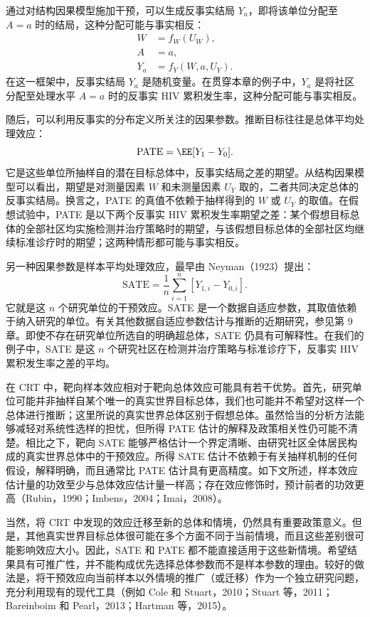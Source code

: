 通过对结构因果模型施加干预，可以生成反事实结局 $Y_a$，即将该单位分配至 $A=a$ 时的结局，这种分配可能与事实相反：
\[
\begin{aligned}
W&=f_W(U_W),\\
A&=a,\\
Y_a&=f_Y(W,a,U_Y).
\end{aligned}
\]
在这一框架中，反事实结局 $Y_a$ 是随机变量。在贯穿本章的例子中，$Y_a$ 是将社区分配至处理水平 $A=a$ 时的反事实 HIV 累积发生率，这种分配可能与事实相反。

随后，可以利用反事实的分布定义所关注的因果参数。推断目标往往是总体平均处理效应：
\[
\mathrm{PATE}=\EE[Y_1-Y_0].
\]
它是这些单位所抽样自的潜在目标总体中，反事实结局之差的期望。从结构因果模型可以看出，期望是对测量因素 $W$ 和未测量因素 $U_Y$ 取的，二者共同决定总体的反事实结局。换言之，PATE 的真值不依赖于抽样得到的 $W$ 或 $U_Y$ 的取值。在假想试验中，PATE 是以下两个反事实 HIV 累积发生率期望之差：某个假想目标总体的全部社区均实施检测并治疗策略时的期望，与该假想目标总体的全部社区均继续标准诊疗时的期望；这两种情形都可能与事实相反。

另一种因果参数是样本平均处理效应，最早由 Neyman（1923）提出：
\[
\mathrm{SATE}=\frac1n\sum_{i=1}^n[Y_{1,i}-Y_{0,i}].
\]
它就是这 $n$ 个研究单位的干预效应。SATE 是一个数据自适应参数，其取值依赖于纳入研究的单位。有关其他数据自适应参数估计与推断的近期研究，参见第 9 章。即使不存在研究单位所选自的明确超总体，SATE 仍具有可解释性。在我们的例子中，SATE 是这 $n$ 个研究社区在检测并治疗策略与标准诊疗下，反事实 HIV 累积发生率之差的平均。

在 CRT 中，靶向样本效应相对于靶向总体效应可能具有若干优势。首先，研究单位可能并非抽样自某个唯一的真实世界目标总体，我们也可能并不希望对这样一个总体进行推断；这里所说的真实世界总体区别于假想总体。虽然恰当的分析方法能够减轻对系统性选样的担忧，但所得 PATE 估计的解释及政策相关性仍可能不清楚。相比之下，靶向 SATE 能够严格估计一个界定清晰、由研究社区全体居民构成的真实世界总体中的干预效应。所得 SATE 估计不依赖于有关抽样机制的任何假设，解释明确，而且通常比 PATE 估计具有更高精度。如下文所述，样本效应估计量的功效至少与总体效应估计量一样高；存在效应修饰时，预计前者的功效更高（Rubin，1990；Imbens，2004；Imai，2008）。

当然，将 CRT 中发现的效应迁移至新的总体和情境，仍然具有重要政策意义。但是，其他真实世界目标总体很可能在多个方面不同于当前情境，而且这些差别很可能影响效应大小。因此，SATE 和 PATE 都不能直接适用于这些新情境。希望结果具有可推广性，并不能构成优先选择总体参数而不是样本参数的理由。较好的做法是，将干预效应向当前样本以外情境的推广（或迁移）作为一个独立研究问题，充分利用现有的现代工具（例如 Cole 和 Stuart，2010；Stuart 等，2011；Bareinboim 和 Pearl，2013；Hartman 等，2015）。
